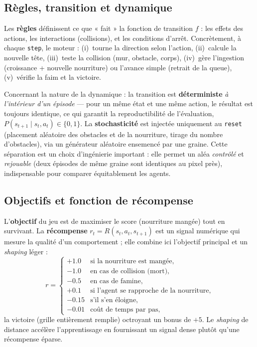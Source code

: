 \documentclass[11pt,a4paper]{article}
\begin{document}
\subsection{Règles, transition et dynamique}
Les \textbf{règles} définissent ce que « fait » la fonction de transition $f$ :
les effets des actions, les interactions (collisions), et les conditions d'arrêt.
Concrètement, à chaque \texttt{step}, le moteur : (i)~tourne la direction selon
l'action, (ii)~calcule la nouvelle tête, (iii)~teste la collision (mur, obstacle,
corps), (iv)~gère l'ingestion (croissance + nouvelle nourriture) ou l'avance
simple (retrait de la queue), (v)~vérifie la faim et la victoire.

Concernant la nature de la dynamique : la transition est \textbf{déterministe}
\emph{à l'intérieur d'un épisode} — pour un même état et une même action, le
résultat est toujours identique, ce qui garantit la reproductibilité de
l'évaluation, $P(s_{t+1}\mid s_t, a_t) \in \{0,1\}$. La \textbf{stochasticité} est
injectée uniquement au \texttt{reset} (placement aléatoire des obstacles et de la
nourriture, tirage du nombre d'obstacles), via un générateur aléatoire ensemencé
par une graine. Cette séparation est un choix d'ingénierie important : elle permet
un aléa \emph{contrôlé} et \emph{rejouable} (deux épisodes de même graine sont
identiques au pixel près), indispensable pour comparer équitablement les agents.

\subsection{Objectifs et fonction de récompense}
L'\textbf{objectif} du jeu est de maximiser le score (nourriture mangée) tout en
survivant. La \textbf{récompense} $r_t = R(s_t, a_t, s_{t+1})$ est un signal
numérique qui mesure la qualité d'un comportement ; elle combine ici l'objectif
principal et un \emph{shaping} léger :
\[
r =
\begin{cases}
+1.0 & \text{si la nourriture est mangée}, \\
-1.0 & \text{en cas de collision (mort)}, \\
-0.5 & \text{en cas de famine}, \\
+0.1 & \text{si l'agent se rapproche de la nourriture}, \\
-0.15 & \text{s'il s'en éloigne}, \\
-0.01 & \text{coût de temps par pas},
\end{cases}
\]
la victoire (grille entièrement remplie) octroyant un bonus de $+5$. Le
\emph{shaping} de distance accélère l'apprentissage en fournissant un signal dense
plutôt qu'une récompense éparse.
\end{document}
